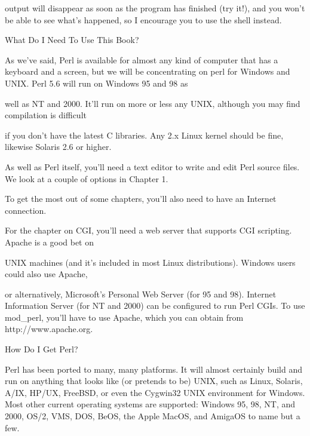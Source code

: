 \documentclass[a4paper,11pt]{book}
\begin{document}
\noindent output will disappear as soon as the program has finished (try it!), and you won't be able to see what's happened, so I encourage you to use the shell instead.

\noindent 

\noindent 

\noindent What Do I Need To Use This Book?

\noindent 

\noindent As we've said, Perl is available for almost any kind of computer that has a keyboard and a screen, but we will be concentrating on perl for Windows and UNIX. Perl 5.6 will run on Windows 95 and 98 as

\noindent well as NT and 2000. It'll run on more or less any UNIX, although you may find compilation is difficult

\noindent if you don't have the latest C libraries. Any 2.x Linux kernel should be fine, likewise Solaris 2.6 or higher.

\noindent 

\noindent As well as Perl itself, you'll need a text editor to write and edit Perl source files. We look at a couple of options in Chapter 1.

\noindent 

\noindent 

\noindent To get the most out of some chapters, you'll also need to have an Internet connection.

\noindent 

\noindent For the chapter on CGI, you'll need a web server that supports CGI scripting. Apache is a good bet on

\noindent UNIX machines (and it's included in most Linux distributions). Windows users could also use Apache,

\noindent or alternatively, Microsoft's Personal Web Server (for 95 and 98). Internet Information Server (for NT and 2000) can be configured to run Perl CGIs. To use mod\_perl, you'll have to use Apache, which you can obtain from http://www.apache.org.

\noindent 

\noindent How Do I Get Perl?

\noindent 

\noindent Perl has been ported to many, many platforms. It will almost certainly build and run on anything that looks like (or pretends to be) UNIX, such as Linux, Solaris, A/IX, HP/UX, FreeBSD, or even the Cygwin32 UNIX environment for Windows. Most other current operating systems are supported: Windows 95, 98, NT, and 2000, OS/2, VMS, DOS, BeOS, the Apple MacOS, and AmigaOS to name but a few.
\end{document}
